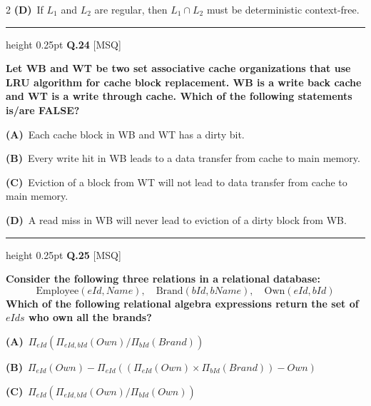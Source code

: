 \documentclass[a4paper,10pt,twoside]{article}
\begin{document}
\begin{multicols}{2}
\textbf{(D)}~If $L_1$ and $L_2$ are regular, then $L_1 \cap L_2$ must be deterministic context-free.
\par\vspace{6pt}\hrule height 0.25pt\vspace{6pt}
\noindent\textbf{Q.24} \hfill {\footnotesize\textsf{[MSQ]}}
\par\vspace{2pt}
{\bfseries Let WB and WT be two set associative cache organizations that use LRU algorithm for cache block replacement. WB is a write back cache and WT is a write through cache. Which of the following statements is/are FALSE? \par}
\par\vspace{2pt}\noindent
\textbf{(A)}~Each cache block in WB and WT has a dirty bit.\par\vspace{2pt}\noindent
\textbf{(B)}~Every write hit in WB leads to a data transfer from cache to main memory.\par\vspace{2pt}\noindent
\textbf{(C)}~Eviction of a block from WT will not lead to data transfer from cache to main memory.\par\vspace{2pt}\noindent
\textbf{(D)}~A read miss in WB will never lead to eviction of a dirty block from WB.
\par\vspace{6pt}\hrule height 0.25pt\vspace{6pt}
\noindent\textbf{Q.25} \hfill {\footnotesize\textsf{[MSQ]}}
\par\vspace{2pt}
{\bfseries Consider the following three relations in a relational database:
\[ \text{Employee}(eId, Name), \quad \text{Brand}(bId, bName), \quad \text{Own}(eId, bId) \]
Which of the following relational algebra expressions return the set of $eIds$ who own all the brands? \par}
\par\vspace{2pt}\noindent
\textbf{(A)}~$\Pi_{eId}(\Pi_{eId, bId}(Own) / \Pi_{bId}(Brand))$\par\vspace{2pt}\noindent
\textbf{(B)}~$\Pi_{eId}(Own) - \Pi_{eId}((\Pi_{eId}(Own) \times \Pi_{bId}(Brand)) - Own)$\par\vspace{2pt}\noindent
\textbf{(C)}~$\Pi_{eId}(\Pi_{eId, bId}(Own) / \Pi_{bId}(Own))$\par\vspace{2pt}\noindent

\end{multicols}
\end{document}
